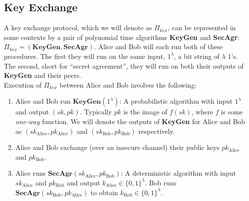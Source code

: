 \subsection{Key Exchange}

A key exchange protocol, which we will denote as $\Pi_{kex}$, can be represented in some contexts by a pair of polynomial time algorithms \textbf{KeyGen} and \textbf{SecAgr}: $\Pi_{kex} = (\textbf{KeyGen},\textbf{SecAgr})$. Alice and Bob will each run both of these procedures. The first they will run on the same input, $1^\lambda$, a bit string of $\lambda$ 1's. The second, short for ``secret agreement'', they will run on both their outputs of \textbf{KeyGen} and their peers.\\

Execution of $\Pi_{kex}$ between Alice and Bob involves the following:
\begin{enumerate}[label=(\roman*)]
\item Alice and Bob run $\textbf{KeyGen}(1^\lambda)$: A probabilistic algorithm with input $1^\lambda$ and output $(sk,pk)$. Typically $pk$ is the image of $f(sk)$, where $f$ is some \emph{one-way} function. We will denote the outputs of \textbf{KeyGen} for Alice and Bob as $(sk_{\text{Alice}},pk_{\text{Alice}})$ and $(sk_{\text{Bob}},pk_{\text{Bob}})$ respectively.
\item Alice and Bob exchange (over an insecure channel) their public keys $pk_{\text{Alice}}$ and $pk_{\text{Bob}}$.
\item Alice runs $\textbf{SecAgr}(sk_{\text{Alice}}, pk_{\text{Bob}})$: A deterministic algorithm with input $sk_{\text{Alice}}$ and $pk_{\text{Bob}}$ and output $k_{\text{Alice}} \in \{0,1\}^\lambda$. Bob runs $\textbf{SecAgr}(sk_{\text{Bob}}, pk_{\text{Alice}})$ to obtain $k_{\text{Bob}} \in \{0,1\}^\lambda$.
\end{enumerate}

